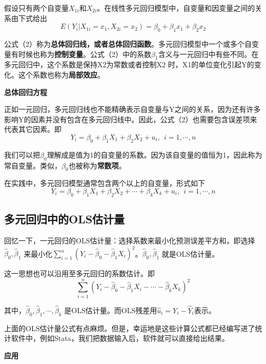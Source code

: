 \documentclass[cn,10pt,math=newtx,citestyle=gb7714-2015,bibstyle=gb7714-2015]{elegantbook}
\begin{document}
	假设只有两个自变量$X_{1i}$和$X_{2i}$。在线性多元回归模型中，自变量和因变量之间的关系由下式给出
	\begin{equation}
		E(Y_i|X_{1i}=x_1,X_{2i}=x_2)=\beta_0+\beta_1x_1+\beta_2x_2
	\end{equation}
	
	公式（2）称为\textbf{总体回归线，或者总体回归函数}。多元回归模型中一个或多个自变量有时候也称为\textbf{控制变量}。公式（2）中的系数$\beta_1$含义与一元回归中有些不同。在多元回归中，这个系数是保持X2为常数或者控制X2 时，X1的单位变化引起Y的变化。这个系数也称为\textbf{局部效应}。
	
	\textbf{总体回归方程}
	
	正如一元回归，多元回归线也不能精确表示自变量与Y之间的关系，因为还有许多影响Y的因素并没有包含在多元回归线中。因此，公式（2）也需要包含误差项来代表其它因素。即
	\begin{equation}
		Y_i=\beta_0+\beta_1X_1+\beta_2X_2+u_i,~~i=1,\cdots,n
	\end{equation}
	
	我们可以把$\beta_0$理解成是值为1的自变量的系数。因为该自变量的值恒为1，因此称为常自变量。类似，$\beta_0$也被称为\textbf{常数项}。
	
	在实践中，多元回归模型通常包含两个以上的自变量，形式如下
	\begin{equation}
		Y_i=\beta_0+\beta_1X_1+\beta_2X_2+\cdots+\beta_kX_k+u_i,~~i=1,\cdots,n
	\end{equation}
	
	\subsection{多元回归中的OLS估计量}
	回忆一下，一元回归的OLS估计量：选择系数来最小化预测误差平方和，即选择$\hat{\beta}_0,\hat{\beta}_1$ 来最小化$\sum_{i=1}^{n}{(Y_i-\hat{\beta}_0-\hat{\beta}_1X_i)^2}$。$\hat{\beta}_0,\hat{\beta}_1$ 就是OLS估计量。
	
	这一思想也可以沿用至多元回归的系数估计。即
	\begin{equation}
		\sum_{i=1}^{n}{(Y_i-\hat{\beta}_0-\hat{\beta}_1X_i-\cdots-\hat{\beta}_kX_k)^2}
	\end{equation}
	
	其中，$\hat{\beta}_0,\hat{\beta}_1,\cdots,\hat{\beta}_k$ 是OLS估计量。而OLS残差用$\hat{u}_i=Y_i-\hat{Y}_i$表示。
	
	上面的OLS估计量公式有点麻烦。但是，幸运地是这些计算公式都已经编写进了统计软件中，例如Stata，我们把数据输入后，软件就可以直接给出结果。
	
	\textbf{应用}
	
\end{document}
